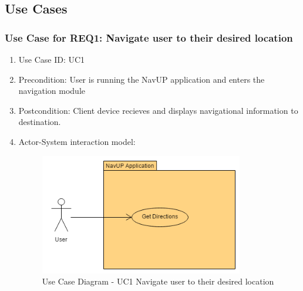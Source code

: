 \documentclass{article}
\begin{document}
	\subsection{Use Cases}
	
		\subsubsection{Use Case for REQ1: Navigate user to their desired location}
			\begin{enumerate}
			\renewcommand{\labelenumi}{{\textbf{\arabic{enumi}.}}}
			\item Use Case ID: UC1
			\item Precondition: User is running the NavUP application and enters the navigation module
			\item Postcondition: Client device recieves and displays navigational information to destination.
			\item Actor-System interaction model:
				\graphicspath{ {./Diagrams/User/} }
				\begin{figure}[h]
				\caption{Use Case Diagram -  UC1 Navigate user to their desired location}
				\includegraphics[height = 200px]{GetDesiredLocation.png}
				\end{figure}
			\end{enumerate}
\end{document}
